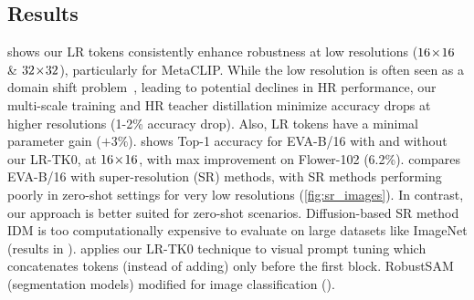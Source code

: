 \subsection{Results}
\label{sec:results}
\textbf{} shows our LR tokens consistently enhance robustness at low resolutions ($16\!\times\!16$ \& $32\!\times\!32$), particularly for MetaCLIP. 
While the low resolution is often seen as a domain shift problem~\citep{9098036},
leading to potential declines in HR performance, our multi-scale training and HR teacher distillation minimize accuracy drops at higher resolutions (1-2\% accuracy drop).
Also, LR tokens have a minimal parameter gain ($+3\%$).
\textbf{} shows Top-1 accuracy for EVA-B/16 with and without our LR-TK0, at $16\!\times\!16$, with max improvement on Flower-102 (6.2\%).
\textbf{} compares EVA-B/16 with super-resolution (SR) methods, with SR methods performing poorly in zero-shot settings for very low resolutions (\cref{fig:sr_images}).
In contrast, our approach is better suited for zero-shot scenarios. 
Diffusion-based SR method IDM is too computationally expensive to evaluate on large datasets like ImageNet (results in \Supp).
\textbf{} applies our LR-TK0 technique to visual prompt tuning which concatenates tokens (instead of adding) only before the first block.
RobustSAM (segmentation models) modified for image classification (\Supp).
\vspace{-2pt}



